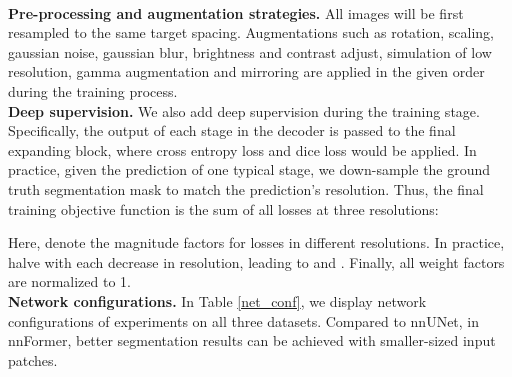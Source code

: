 \documentclass[journal,twoside,web]{ieeecolor}
\begin{document}
\\



\noindent \textbf{Pre-processing and augmentation strategies.} All images will be first resampled to the same target spacing. Augmentations such as rotation, scaling, gaussian noise, gaussian blur, brightness and contrast adjust, simulation of low resolution, gamma augmentation and mirroring are applied in the given order during the training process. \\

\noindent \textbf{Deep supervision.} We also add deep supervision during the training stage. Specifically, the output of each stage in the decoder is passed to the final expanding block, where cross entropy loss and dice loss would be applied. In practice, given the prediction of one typical stage, we down-sample the ground truth segmentation mask to match the prediction's resolution. Thus, the final training objective function is the sum of all losses at three resolutions: 

Here,  denote the magnitude factors for losses in different resolutions. In practice,  halve with each decrease in
resolution, leading to  and . Finally, all weight factors are normalized to 1. \\



\noindent \textbf{Network configurations.} In Table \ref{net_conf}, we display network configurations of experiments on all three datasets. Compared to nnUNet, in nnFormer, better segmentation results can be achieved with smaller-sized input patches.
\end{document}
